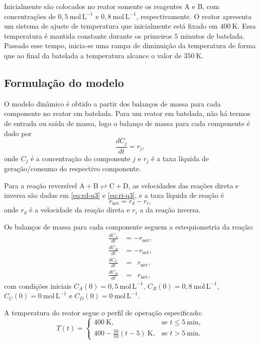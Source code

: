 \documentclass{article}
\begin{document}
Inicialmente são colocados no reator somente os reagentes A e B, com concentrações de $0{,}5\ \mathrm{mol\,L^{-1}}$ e $0{,}8\ \mathrm{mol\,L^{-1}}$, respectivamente. O reator apresenta um sistema de ajuste de temperatura que inicialmente está fixado em $400\ \mathrm{K}$. Essa temperatura é mantida constante durante os primeiros $5$ minutos de batelada. Passado esse tempo, inicia-se uma rampa de diminuição da temperatura de forma que ao final da batelada a temperatura alcance o valor de $350\ \mathrm{K}$.

\subsection*{Formulação do modelo}

O modelo dinâmico é obtido a partir dos balanços de massa para cada componente no reator em batelada. Para um reator em batelada, não há termos de entrada ou saída de massa, logo o balanço de massa para cada componente é dado por
\begin{equation*}
  \frac{dC_j}{dt} = r_j,
\end{equation*}
onde $C_j$ é a concentração do componente $j$ e $r_j$ é a taxa líquida de geração/consumo do respectivo componente.

Para a reação reversível $\mathrm{A} + \mathrm{B} \rightleftharpoons \mathrm{C} + \mathrm{D}$, as velocidades das reações direta e inversa são dadas em \eqref{eq:rd-q3} e \eqref{eq:ri-q3}, e a taxa líquida de reação é
\begin{equation}
  r_{\text{net}} = r_d - r_i, \label{eq:rnet-q3}
\end{equation}
onde $r_d$ é a velocidade da reação direta e $r_i$ a da reação inversa.

Os balanços de massa para cada componente seguem a estequiometria da reação:
\begin{align}
  \frac{dC_A}{dt} &= -r_{\text{net}}, \label{eq:balanco-A-q3} \\
  \frac{dC_B}{dt} &= -r_{\text{net}}, \label{eq:balanco-B-q3} \\
  \frac{dC_C}{dt} &= \;\;r_{\text{net}}, \label{eq:balanco-C-q3} \\
  \frac{dC_D}{dt} &= \;\;r_{\text{net}}, \label{eq:balanco-D-q3}
\end{align}
com condições iniciais $C_A(0) = 0{,}5\ \mathrm{mol\,L^{-1}}$, $C_B(0) = 0{,}8\ \mathrm{mol\,L^{-1}}$, $C_C(0) = 0\ \mathrm{mol\,L^{-1}}$ e $C_D(0) = 0\ \mathrm{mol\,L^{-1}}$.

A temperatura do reator segue o perfil de operação especificado:
\begin{equation}
  T(t) = \begin{cases}
    400\ \mathrm{K}, & \text{se } t \leq 5\ \mathrm{min}, \\
    400 - \frac{50}{10}(t - 5)\ \mathrm{K}, & \text{se } t > 5\ \mathrm{min}.
  \end{cases}
  \label{eq:temperatura-q3}
\end{equation}
\end{document}
